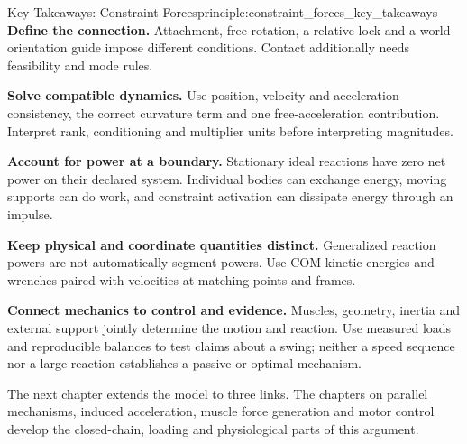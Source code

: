 \begin{principle}{Key Takeaways: Constraint Forces}{principle:constraint_forces_key_takeaways}
\textbf{Define the connection.} Attachment, free rotation, a relative lock and a world-orientation guide impose different conditions. Contact additionally needs feasibility and mode rules.

\textbf{Solve compatible dynamics.} Use position, velocity and acceleration consistency, the correct curvature term and one free-acceleration contribution. Interpret rank, conditioning and multiplier units before interpreting magnitudes.

\textbf{Account for power at a boundary.} Stationary ideal reactions have zero net power on their declared system. Individual bodies can exchange energy, moving supports can do work, and constraint activation can dissipate energy through an impulse.

\textbf{Keep physical and coordinate quantities distinct.} Generalized reaction powers are not automatically segment powers. Use COM kinetic energies and wrenches paired with velocities at matching points and frames.

\textbf{Connect mechanics to control and evidence.} Muscles, geometry, inertia and external support jointly determine the motion and reaction. Use measured loads and reproducible balances to test claims about a swing; neither a speed sequence nor a large reaction establishes a passive or optimal mechanism.
\end{principle}

The next chapter extends the model to three links. The chapters on parallel mechanisms, induced acceleration, muscle force generation and motor control develop the closed-chain, loading and physiological parts of this argument.

